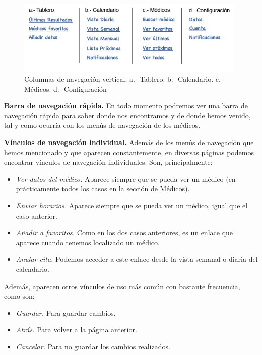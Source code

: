 		\begin{figure}[H]
		  \centering
		    \includegraphics[width=11cm]{img/jpg/nav/paciente_lat1.jpg}
		  \caption{Columnas de navegación vertical. a.- Tablero. b.- Calendario. c.- Médicos. d.- Configuración}
		  \label{fig:nav_paciente_lat1}
		\end{figure}
		
		\textbf{Barra de navegación rápida.} En todo momento podremos ver una barra de navegación rápida para saber donde nos encontramos y de donde hemos venido, tal y como ocurría con los menús de navegación de los médicos.
		
		\textbf{Vínculos de navegación individual.} Además de los menús de navegación que hemos mencionado y que aparecen constantemente, en diversas páginas podemos encontrar vínculos de navegación individuales. Son, principalmente:
		\begin{itemize}
			\item \textit{Ver datos del médico.} Aparece siempre que se pueda ver un médico (en prácticamente todos los casos en la sección de Médicos).
			\item \textit{Enviar horarios.} Aparece siempre que se pueda ver un médico, igual que el caso anterior.
			\item \textit{Añadir a favoritos.} Como en los dos casos anteriores, es un enlace que aparece cuando tenemos localizado un médico.
			\item \textit{Anular cita.} Podemos acceder a este enlace desde la vista semanal o diaria del calendario. 
		\end{itemize}
		
		Además, aparecen otros vínculos de uso más común con bastante frecuencia, como son:
		\begin{itemize}
			\item \textit{Guardar.} Para guardar cambios.
			\item \textit{Atrás.} Para volver a la página anterior.
			\item \textit{Cancelar.} Para no guardar los cambios realizados.
		\end{itemize}
		
